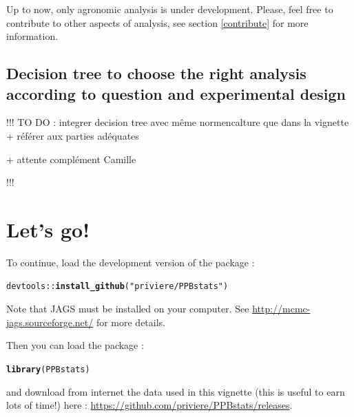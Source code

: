 \documentclass{book}\usepackage[]{graphicx}\usepackage[]{color}
\makeatletter
\newcommand{\hlstr}[1]{\textcolor[rgb]{0.192,0.494,0.8}{#1}}%
\newcommand{\hlopt}[1]{\textcolor[rgb]{0,0,0}{#1}}%
\newcommand{\hlstd}[1]{\textcolor[rgb]{0.345,0.345,0.345}{#1}}%
\newcommand{\hlkwd}[1]{\textcolor[rgb]{0.737,0.353,0.396}{\textbf{#1}}}%
\newenvironment{kframe}{%
 \def\at@end@of@kframe{}%
 \ifinner\ifhmode%
  \def\at@end@of@kframe{\end{minipage}}%
  \begin{minipage}{\columnwidth}%
 \fi\fi%
 \def\FrameCommand##1{\hskip\@totalleftmargin \hskip-\fboxsep
 \colorbox{shadecolor}{##1}\hskip-\fboxsep
     \hskip-\linewidth \hskip-\@totalleftmargin \hskip\columnwidth}%
 \MakeFramed {\advance\hsize-\width
   \@totalleftmargin\z@ \linewidth\hsize
   \@setminipage}}%
 {\par\unskip\endMakeFramed%
 \at@end@of@kframe}
\newenvironment{knitrout}{}{} %
\makeatother
\begin{document}
Up to now, only agronomic analysis is under development. 
Please, feel free to contribute to other aspects of analysis, see section \ref{contribute} for more information.


\subsection{Decision tree to choose the right analysis according to question and experimental design}


!!! 
TO DO : integrer decision tree avec même normencalture que dans la vignette + référer aux parties adéquates

+ attente complément Camille

!!!

\section{Let's go!}
To continue, load the development version of the package :

\begin{knitrout}
\color{fgcolor}\begin{kframe}
\begin{alltt}
\hlstd{devtools}\hlopt{::}\hlkwd{install_github}\hlstd{(}\hlstr{"priviere/PPBstats"}\hlstd{)}
\end{alltt}
\end{kframe}
\end{knitrout}

Note that JAGS must be installed on your computer.
See \url{http://mcmc-jags.sourceforge.net/} for more details.

Then you can load the package :

\begin{knitrout}
\color{fgcolor}\begin{kframe}
\begin{alltt}
\hlkwd{library}\hlstd{(PPBstats)}
\end{alltt}
\end{kframe}
\end{knitrout}

and download from internet the data used in this vignette (this is useful to earn lots of time!) here : \url{https://github.com/priviere/PPBstats/releases}.

\end{document}
